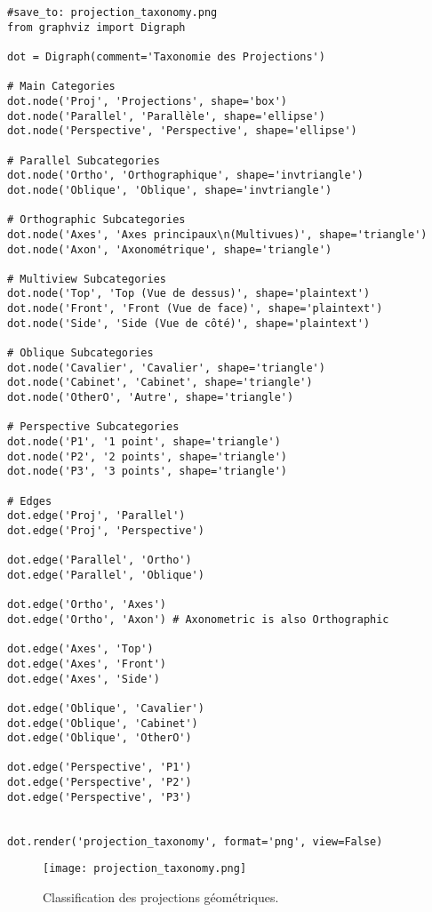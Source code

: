 \documentclass{article}
\begin{document}
\begin{verbatim}
#save_to: projection_taxonomy.png
from graphviz import Digraph

dot = Digraph(comment='Taxonomie des Projections')

# Main Categories
dot.node('Proj', 'Projections', shape='box')
dot.node('Parallel', 'Parallèle', shape='ellipse')
dot.node('Perspective', 'Perspective', shape='ellipse')

# Parallel Subcategories
dot.node('Ortho', 'Orthographique', shape='invtriangle')
dot.node('Oblique', 'Oblique', shape='invtriangle')

# Orthographic Subcategories
dot.node('Axes', 'Axes principaux\n(Multivues)', shape='triangle')
dot.node('Axon', 'Axonométrique', shape='triangle')

# Multiview Subcategories
dot.node('Top', 'Top (Vue de dessus)', shape='plaintext')
dot.node('Front', 'Front (Vue de face)', shape='plaintext')
dot.node('Side', 'Side (Vue de côté)', shape='plaintext')

# Oblique Subcategories
dot.node('Cavalier', 'Cavalier', shape='triangle')
dot.node('Cabinet', 'Cabinet', shape='triangle')
dot.node('OtherO', 'Autre', shape='triangle')

# Perspective Subcategories
dot.node('P1', '1 point', shape='triangle')
dot.node('P2', '2 points', shape='triangle')
dot.node('P3', '3 points', shape='triangle')

# Edges
dot.edge('Proj', 'Parallel')
dot.edge('Proj', 'Perspective')

dot.edge('Parallel', 'Ortho')
dot.edge('Parallel', 'Oblique')

dot.edge('Ortho', 'Axes')
dot.edge('Ortho', 'Axon') # Axonometric is also Orthographic

dot.edge('Axes', 'Top')
dot.edge('Axes', 'Front')
dot.edge('Axes', 'Side')

dot.edge('Oblique', 'Cavalier')
dot.edge('Oblique', 'Cabinet')
dot.edge('Oblique', 'OtherO')

dot.edge('Perspective', 'P1')
dot.edge('Perspective', 'P2')
dot.edge('Perspective', 'P3')


dot.render('projection_taxonomy', format='png', view=False)
\end{verbatim}

\begin{figure}[H]
\centering
\texttt{[image: projection\_taxonomy.png]}
\caption{Classification des projections géométriques.}
\label{fig:projection_taxonomy}
\end{figure}
\end{document}
